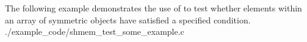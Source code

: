\begin{apidefinition}


\begin{apiexamples}
  \apicexample
      {The following example demonstrates the use of 
      to test whether elements within an array of symmetric objects have
      satisfied a specified condition.}
      {./example_code/shmem_test_some_example.c}
      {}
\end{apiexamples}

\end{apidefinition}
